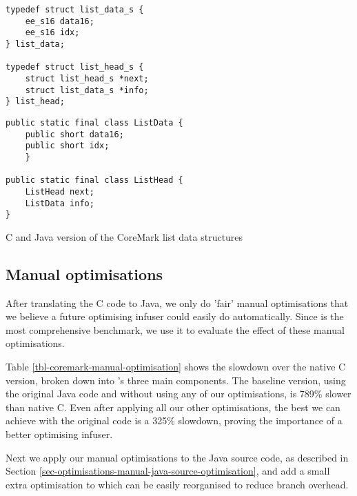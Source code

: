 \begin{listing}
\centering
\begin{minipage}[t]{0.48\textwidth}
\centering
\begin{verbatim}
typedef struct list_data_s {
    ee_s16 data16;
    ee_s16 idx;
} list_data;

typedef struct list_head_s {
    struct list_head_s *next;
    struct list_data_s *info;
} list_head;
\end{verbatim}
\end{minipage}\hfill
\begin{minipage}[t]{0.48\textwidth}
\centering
\begin{verbatim}
public static final class ListData {
    public short data16;
    public short idx;
    }

public static final class ListHead {
    ListHead next;
    ListData info;
}
\end{verbatim}
\end{minipage}
\caption{C and Java version of the CoreMark list data structures}
\label{lst-coremark-list-data-structures}
\end{listing}

\subsection{Manual optimisations}
\label{sec-evaluation-manual-optimisations}
After translating the C code to Java, we only do 'fair' manual optimisations that we believe a future optimising infuser could easily do automatically. Since  is the most comprehensive benchmark, we use it to evaluate the effect of these manual optimisations.



Table \ref{tbl-coremark-manual-optimisation} shows the slowdown over the native C version, broken down into 's three main components. The baseline version, using the original Java code and without using any of our optimisations, is 789\% slower than native C. Even after applying all our other optimisations, the best we can achieve with the original code is a 325\% slowdown, proving the importance of a better optimising infuser.

Next we apply our manual optimisations to the Java source code, as described in Section \ref{sec-optimisations-manual-java-source-optimisation}, and add a small extra optimisation to  which can be easily reorganised to reduce branch overhead.

